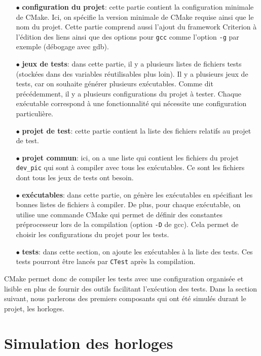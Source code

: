 \documentclass[a4paper]{article}
\begin{document}
\begin{itemize}
  \item[$\bullet$] \textbf{configuration du projet}: cette partie contient la
    configuration minimale de CMake. Ici, on spécifie la version minimale de
    CMake requise ainsi que le nom du projet. Cette partie comprend aussi
    l'ajout du framework Criterion à l'édition des liens ainsi que des options
    pour \verb|gcc| comme l'option \verb|-g| par exemple (débogage
    avec gdb).
  \item[$\bullet$] \textbf{jeux de tests}: dans cette partie, il y a plusieurs
    listes de fichiers tests (stockées dans des variables réutilisables plus
    loin). Il y a plusieurs jeux de tests, car on souhaite générer plusieurs
    exécutables. Comme dit précédemment, il y a plusieurs configurations du
    projet à tester. Chaque exécutable correspond à une fonctionnalité qui
    nécessite une configuration particulière.
  \item[$\bullet$] \textbf{projet de test}: cette partie contient la liste des
    fichiers relatifs au projet de test.
  \item[$\bullet$] \textbf{projet commun}: ici, on a une liste qui contient les
    fichiers du projet \verb|dev_pic| qui sont à compiler avec tous les
    exécutables. Ce sont les fichiers dont tous les jeux de tests ont besoin.
  \item[$\bullet$] \textbf{exécutables}: dans cette partie, on génère les
    exécutables en spécifiant les bonnes listes de fichiers à compiler. De plus,
    pour chaque exécutable, on utilise une commande CMake qui permet de définir
    des constantes préprocesseur lors de la compilation (option \verb|-D|
    de gcc). Cela permet de choisir les configurations du projet pour les tests.
  \item[$\bullet$] \textbf{tests}: dans cette section, on ajoute les exécutables
    à la liste des tests. Ces tests pourront être lancés par \verb|CTest|
    après la compilation.
\end{itemize}

CMake permet donc de compiler les tests avec une configuration organisée et
lisible en plus de fournir des outils facilitant l'exécution des tests. Dans la
section suivant, nous parlerons des premiers composants qui ont été simulés
durant le projet, les horloges.

\section{Simulation des horloges}%
\label{simuhorologes}
\end{document}

